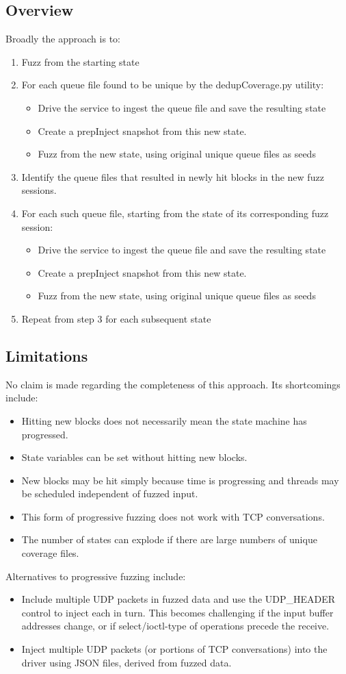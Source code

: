 \documentclass[titlepage]{article}
\begin{document}
\begin{appendices}
\subsection{Overview}
Broadly the approach is to:
\begin{enumerate} 
\item Fuzz from the starting state
\item For each queue file found to be unique by the dedupCoverage.py utility:
\begin{itemize}
\item Drive the service to ingest the queue file and save the resulting state
\item Create a prepInject snapshot from this new state.
\item Fuzz from the new state, using original unique queue files as seeds
\end{itemize}
\item Identify the queue files that resulted in newly hit blocks in the new fuzz sessions.
\item For each such queue file, starting from the state of its corresponding fuzz session:
\begin{itemize}
\item Drive the service to ingest the queue file and save the resulting state
\item Create a prepInject snapshot from this new state.
\item Fuzz from the new state, using original unique queue files as seeds
\end{itemize}
\item Repeat from step 3 for each subsequent state
\end{enumerate} 
\subsection{Limitations}
No claim is made regarding the completeness of this approach. Its shortcomings include:
\begin{itemize}
\item Hitting new blocks does not necessarily mean the state machine has progressed.
\item State variables can be set without hitting new blocks.
\item New blocks may be hit simply because time is progressing and threads may be scheduled independent of fuzzed input.
\item This form of progressive fuzzing does not work with TCP conversations.
\item The number of states can explode if there are large numbers of unique coverage files.  
\end{itemize}
Alternatives to progressive fuzzing include:
\begin{itemize}
\item Include multiple UDP packets in fuzzed data and use the UDP\_HEADER control to inject each in turn.  This becomes challenging if 
the input buffer addresses change, or if select/ioctl-type of operations precede the receive.
\item Inject multiple UDP packets (or portions of TCP conversations) into the driver using JSON files, derived from fuzzed data.
\end{itemize}

\end{appendices}
\end{document}
